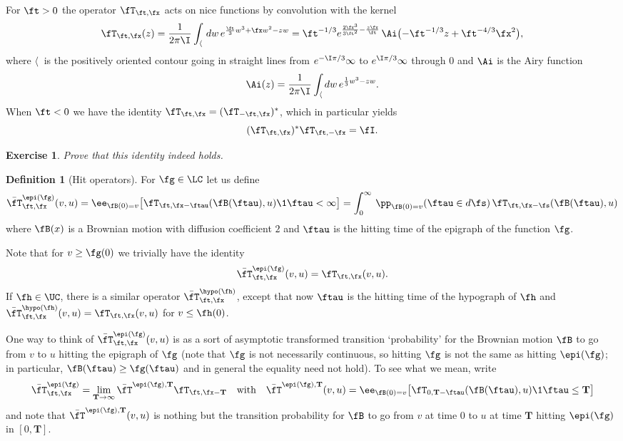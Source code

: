 \documentclass[]{pcmi}
\theoremstyle{plain}
\newtheorem{exercise}[equation]{Exercise}
\theoremstyle{definition}
\newtheorem{definition}[equation]{Definition}
\begin{document}
For $\ft>0$ the operator $\fT_{\ft,\fx}$ acts on nice functions by convolution with the kernel
\begin{equation}\label{eq:fTdef}
\fT_{\ft,\fx}(z)=\frac1{2\pi\I} \int_{\langle}\, dw\,e^{\frac{\ft}3 w^3+\fx  w^2-z w} = \ft^{-1/3} e^{\frac{2 \fx^3}{3\ft^2} -\frac{z\fx}{\ft} }\,\Ai \bigl(-\ft^{-1/3} z+\ft^{-4/3}\fx^2\bigr),
\end{equation} 
where ${\langle}~$ is the positively oriented contour going in straight lines from $e^{-\I\pi/3}\infty$ to $e^{\I\pi/3}\infty$ through $0$ and $\Ai$ is the Airy function 
\[
\Ai(z)= \frac1{2\pi\I} \int_{\langle}dw\, e^{\frac{1}3 w^3-z w}.
\]
When $\ft<0$ we have the identity $\fT_{\ft,\fx}=(\fT_{-\ft,\fx})^*$, which in particular yields
\begin{equation}
  (\fT_{\ft,\fx})^*\fT_{\ft,-\fx}=\fI.
\end{equation}

\begin{exercise}
 Prove that this identity indeed holds.
\end{exercise}

\begin{definition}[Hit operators]\label{def:hit}
For $\fg\in \LC$ let us define
\begin{equation}
\bar{\fT}^{\epi(\fg)}_{\ft,\fx}(v,u)=\ee_{\fB(0)=v}\big[\fT_{\ft,\fx-\ftau}(\fB(\ftau),u)\1{\ftau<\infty}\big]=\int_{0}^\infty\,\pp_{\fB(0)=v}(\ftau\in d\fs)\,\fT_{\ft,\fx-\fs}(\fB(\ftau),u)
\end{equation}
where $\fB(x)$ is a Brownian motion with diffusion coefficient $2$ and $\ftau$ is the hitting time of the epigraph of the function $\fg$.
\end{definition}

Note that for $v\ge\fg(0)$ we trivially have the identity
\begin{equation}\label{eq:epiabove}
\bar{\fT}^{\epi(\fg)}_{\ft,\fx}(v,u)=\fT_{\ft,\fx}(v,u).
\end{equation}
If $\fh\in \UC$, there is a similar operator $\bar{\fT}^{\hypo(\fh)}_{\ft,\fx}$, except that now $\ftau$ is the hitting time of the  hypograph of $\fh$ and $\bar{\fT}^{\hypo(\fh)}_{\ft,\fx}(v,u)=\fT_{\ft,\fx}(v,u)$ for $v\le\fh(0)$.

One way to think of $\bar{\fT}^{\epi(\fg)}_{\ft,\fx}(v,u)$ is as a sort of asymptotic transformed transition `probability' for the Brownian motion $\fB$ to go from $v$ to $u$ hitting the epigraph of $\fg$ (note that $\fg$ is not necessarily continuous, so hitting $\fg$ is not the same as hitting $\epi(\fg)$; in particular, $\fB(\ftau)\geq\fg(\ftau)$ and in general the equality need not hold).
To see what we mean, write
\begin{equation}\label{eq:asymptTransTransProb}
\bar{\fT}^{\epi(\fg)}_{\ft,\fx}=\lim_{\mathbf{T}\to\infty}\bar{\fT}^{\epi(\fg),\mathbf{T}}\fT_{\ft,\fx-\mathbf{T}}
\quad\text{with}\quad\bar{\fT}^{\epi(\fg),\mathbf{T}}(v,u)=\ee_{\fB(0)=v}\big[\fT_{0,\mathbf{T}-\ftau}(\fB(\ftau),u)\1{\ftau\leq\mathbf{T}}\big]
\end{equation}
and note that $\bar{\fT}^{\epi(\fg),\mathbf{T}}(v,u)$ is nothing but the transition probability for $\fB$ to go from $v$ at time 0 to $u$ at time $\mathbf{T}$ hitting $\epi(\fg)$ in $[0,\mathbf{T}]$.
\end{document}
